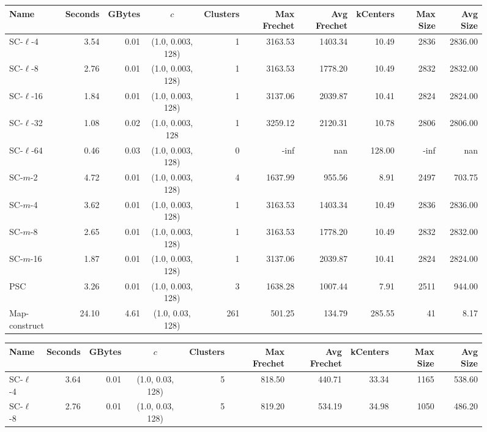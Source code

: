 \documentclass[11pt]{article}
\begin{document}
\begin{figure}[h] \begin{center}
        \begin{minipage}{\textwidth}
    {
    \begin{tabular}{@{}lrrcrrrrrr@{}}
        \toprule
        Name & Seconds & GBytes & $c$ & Clusters & Max Frechet & Avg Frechet & kCenters & Max Size & Avg Size\\
        \midrule
        SC-$\ell$-4 & 3.54 & 0.01 & (1.0, 0.003, 128) & 1 & 3163.53 & 1403.34 & 10.49 & 2836 & 2836.00\\
        SC-$\ell$-8 & 2.76 & 0.01 & (1.0, 0.003, 128) & 1 & 3163.53 & 1778.20 & 10.49 & 2832 & 2832.00\\
        SC-$\ell$-16 & 1.84 & 0.01 & (1.0, 0.003, 128) & 1 & 3137.06 & 2039.87 & 10.41 & 2824 & 2824.00\\
        SC-$\ell$-32 & 1.08 & 0.02 & (1.0, 0.003, 128 & 1 & 3259.12 & 2120.31 & 10.78 & 2806 & 2806.00\\
        SC-$\ell$-64 & 0.46 & 0.03 & (1.0, 0.003, 128) & 0 & -inf & nan & 128.00 & -inf & nan\\
        SC-$m$-2 & 4.72 & 0.01 & (1.0, 0.003, 128) & 4 & 1637.99 & 955.56 & 8.91 & 2497 & 703.75\\
        SC-$m$-4 & 3.62 & 0.01 & (1.0, 0.003, 128) & 1 & 3163.53 & 1403.34 & 10.49 & 2836 & 2836.00\\
        SC-$m$-8 & 2.65 & 0.01 & (1.0, 0.003, 128) & 1 & 3163.53 & 1778.20 & 10.49 & 2832 & 2832.00\\
        SC-$m$-16 & 1.87 & 0.01 & (1.0, 0.003, 128) & 1 & 3137.06 & 2039.87 & 10.41 & 2824 & 2824.00\\
        PSC & 3.26 & 0.01 & (1.0, 0.003, 128) & 3 & 1638.28 & 1007.44 & 7.91 & 2511 & 944.00\\
        Map-construct & 24.10 & 4.61 & (1.0, 0.03, 128) & 261 & 501.25 & 134.79 & 285.55 & 41 & 8.17\\
        \bottomrule
    \end{tabular}}
%
    {
    \begin{tabular}{@{}lrrcrrrrrr@{}}
        \toprule
        Name & Seconds & GBytes & $c$ & Clusters & Max Frechet & Avg Frechet & kCenters & Max Size & Avg Size\\
        \midrule
        SC-$\ell$-4 & 3.64 & 0.01 & (1.0, 0.03, 128) & 5 & 818.50 & 440.71 & 33.34 & 1165 & 538.60\\
        SC-$\ell$-8 & 2.76 & 0.01 & (1.0, 0.03, 128) & 5 & 819.20 & 534.19 & 34.98 & 1050 & 486.20\\

\end{tabular}}
\end{minipage}
\end{center}
\end{figure}
\end{document}

